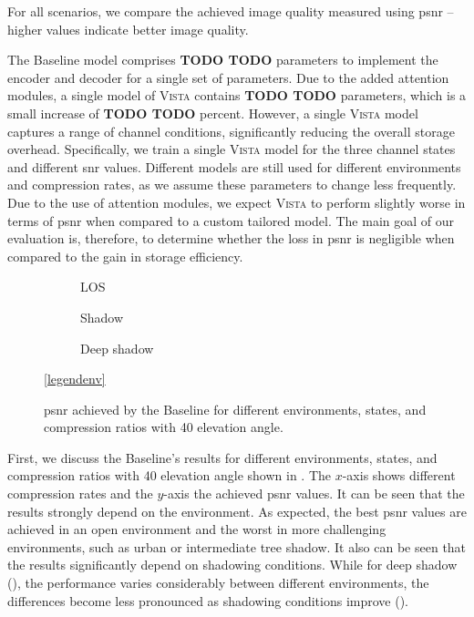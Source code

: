 \documentclass[conference]{IEEEtran}
\newcommand\ours{\textsc{Vista}\xspace}
\newcommand\baseline{Baseline\xspace}
\begin{document}
For all scenarios, we compare the achieved image quality measured using \ac{psnr} -- higher values indicate better image quality.

The \baseline model comprises \textbf{TODO TODO} parameters to implement the encoder and decoder for a single set of parameters.
Due to the added attention modules, a single model of \ours contains \textbf{TODO TODO} parameters, which is a small increase of \textbf{TODO TODO} percent.
However, a single \ours model captures a range of channel conditions, significantly reducing the overall storage overhead.
Specifically, we train a single \ours model for the three channel states and different \ac{snr} values.
Different models are still used for different environments and compression rates, as we assume these parameters to change less frequently.
Due to the use of attention modules, we expect \ours to perform slightly worse in terms of \ac{psnr} when compared to a custom tailored model.
The main goal of our evaluation is, therefore, to determine whether the loss in \ac{psnr} is negligible when compared to the gain in storage efficiency.


\begin{figure}
  \begin{subfigure}{.32\linewidth}
  \centering
  
  \caption{LOS}
  \label{subfig:baseline_los}
\end{subfigure}
\hfill
\begin{subfigure}{.32\linewidth}
  \centering
  
  \caption{Shadow}
  \label{subfig:baseline_shadow}
\end{subfigure}
\hfill
\begin{subfigure}{.32\linewidth}
  \centering
  
  \caption{Deep shadow}
  \label{subfig:baseline_deep_shadow}
\end{subfigure}

\vspace{1em}
\centering
\ref{legendenv}

\caption{\ac{psnr} achieved by the \baseline for different environments, states, and compression ratios with 40\textdegree{} elevation angle.}
\label{fig:different_scenes_40}
\end{figure}

First, we discuss the \baseline's results for different environments, states, and compression ratios with 40\textdegree{} elevation angle shown in . 
The $x$-axis shows different compression rates and the $y$-axis the achieved \ac{psnr} values.
It can be seen that the results strongly depend on the environment.
As expected, the best \ac{psnr} values are achieved in an open environment and the worst in more challenging environments, such as urban or intermediate tree shadow.
It also can be seen that the results significantly depend on shadowing conditions. 
While for deep shadow (), the performance varies considerably between different environments, 
the differences become less pronounced as shadowing conditions improve ().
\end{document}
